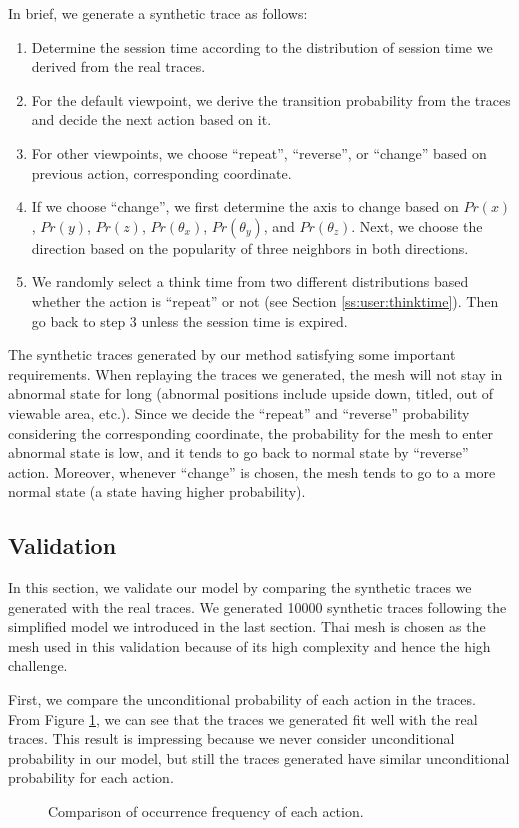 In brief, we generate a synthetic trace as follows:
\begin{enumerate}
    \item Determine the session time according to the distribution of session time we derived from the real traces.
    \item For the default viewpoint, we derive the transition probability from the traces and decide the
        next action based on it.
    \item For other viewpoints, we choose ``repeat'', ``reverse'', or ``change'' 
        based on {previous action, corresponding coordinate}.
    \item If we choose ``change'', 
        we first determine the axis to change based on $Pr(x)$, $Pr(y)$, $Pr(z)$, 
        $Pr(\theta_x)$, $Pr(\theta_y)$, and $Pr(\theta_z)$. 
        Next, we choose the direction based on the popularity of three
        neighbors in both directions.
    \item We randomly select a think time from two different distributions 
        based whether the action is ``repeat'' or not (see Section \ref{ss:user:thinktime}).
        Then go back to step 3 unless the session time is expired.
\end{enumerate}

The synthetic traces generated by our method satisfying some important requirements. 
When replaying the traces we generated, the mesh will not stay in abnormal state for long 
(abnormal positions include upside down, titled, out of viewable area, etc.).
Since we decide the ``repeat'' and ``reverse'' probability considering the corresponding coordinate,
the probability for the mesh to enter abnormal state is low, and it tends to go back to normal state
by ``reverse'' action. 
Moreover, whenever ``change'' is chosen, 
the mesh tends to go to a more normal state (a state having higher probability). 

\subsection{Validation}
In this section, we validate our model by comparing the synthetic traces we generated with the real traces.
We generated 10000 synthetic traces following the simplified model we introduced in the last section.
Thai mesh is chosen as the mesh used in this validation because of its high complexity and hence
the high challenge.

First, we compare the unconditional probability of each action in the traces. 
From Figure \ref{f:user:frequency_comp}, we can see that the traces we generated fit well with the real traces. 
This result is impressing because we never consider unconditional probability in our model, but  
still the traces generated have similar unconditional probability for each action.
\begin{figure}[htdp!]
    \centering
    \caption{Comparison of occurrence frequency of each action.}
    \label{f:user:frequency_comp}
\end{figure}

